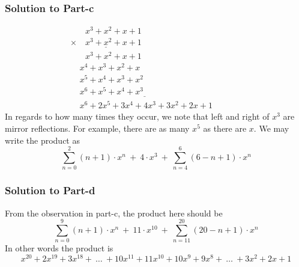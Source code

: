 \documentclass[12pt]{article}
\begin{document}
\subsubsection*{Solution to Part-c}
\begin{equation*}
	\begin{array}{c}
		\phantom{\times99}x^3+x^2+x+1\\
		\underline{\times\phantom{99} x^3+x^2+x+1}\\
		\phantom{\times99}x^3+x^2+x+1\\
		\phantom\times x^4+x^3+x^2+x\phantom{9999}\\
		\phantom\times x^5+x^4+x^3+x^2\phantom{99999999999}\\
		\underline{\phantom\times x^6+x^5+x^4+x^3\phantom{999999999999999999}}\\
		\phantom\times x^6+2x^5+3x^4+4x^3+3x^2+2x+1\phantom{9999999}
	\end{array}
\end{equation*}
In regards to how many times they occur, we note that left and right of $x^3$ are mirror reflections. For example, there are as many $x^5$ as there are $x$. We may write the product as
\[
\sum_{n=0}^{2}(n+1) \cdot x^n\ +\ 4 \cdot x^3\ +\ \sum_{n=4}^{6} (6-n+1) \cdot x^n
\]

\subsubsection*{Solution to Part-d}
From the observation in part-c, the product here should be
\[
\sum_{n=0}^{9}(n+1) \cdot x^n\ +\ 11 \cdot x^{10}\ +\ \sum_{n=11}^{20}(20-n+1) \cdot x^n
\]
In other words the product is 
\[
x^{20}+2x^{19}+3x^{18}+\ \ldots\ +10x^{11}+11x^{10}+10x^9+9x^8+\ \ldots\ +3x^2+2x+1
\]
\end{document}
